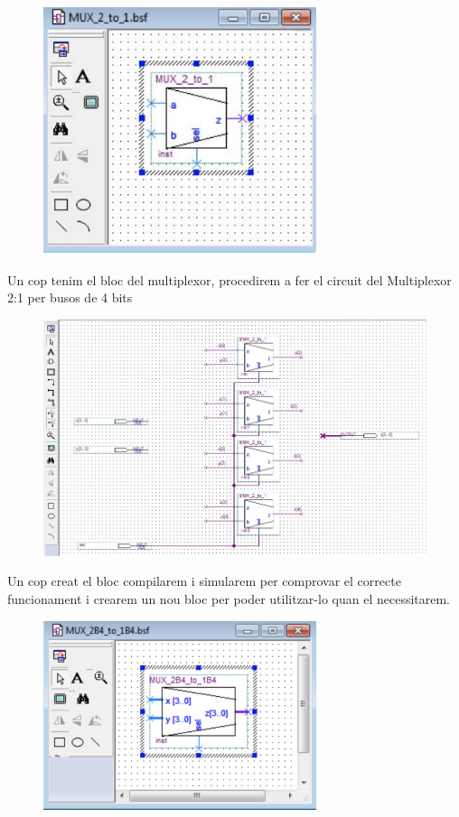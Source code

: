\documentclass[12pt, a4papre]{article}
\begin{document}
	\begin{figure}[H]
		\begin{center}
		\includegraphics[width=80mm]{blocmultiplexor.jpeg}
		\end{center}
	\end{figure}
		
	Un cop tenim el bloc del multiplexor, procedirem a fer el circuit del Multiplexor 2:1 per busos de 4 bits
		\begin{figure}[H]
		\begin{center}
		\includegraphics[width=150mm]{mult4bits.jpeg}
		\end{center}
	\end{figure}
	
	Un cop creat el bloc compilarem i simularem per comprovar el correcte funcionament i crearem un nou bloc per poder utilitzar-lo quan el necessitarem.
	
	\begin{figure}[H]
		\begin{center}
		\includegraphics[width=80mm]{blocnoumult.jpeg}
		\end{center}
	\end{figure}
	
\end{document}
